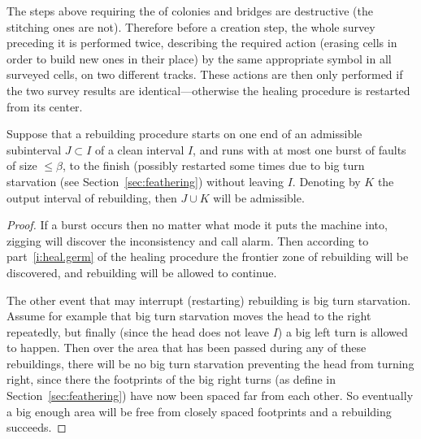 \documentclass[11pt]{memoir}
\theoremstyle{definition} %
\renewcommand{\le}{\leq}
\def\B{B}
\newcommand{\Tu}{T}
\newcommand{\Tus}{T^{*}}
\begin{document}
The steps above requiring the  of colonies and bridges are destructive
(the stitching ones are not).
Therefore before a creation step, the whole survey preceding it is performed twice, 
describing the required action (erasing cells in order to build new ones in their place)
by the same appropriate symbol in all surveyed cells, on two different tracks.
These actions 
are then only performed if the two survey results are identical---otherwise
the healing procedure is restarted from its center.

\begin{lemma}\label{lem:rebuild-health}
  Suppose that a rebuilding procedure starts on one end of an admissible subinterval
  \( J\subset I \) of a clean interval \( I \), and runs with at most one burst of faults
  of size \( \le\beta \), to the finish (possibly restarted
  some times due to big turn starvation (see Section~\ref{sec:feathering}) without leaving \( I \).
  Denoting by \( K \) the output interval of rebuilding, then \( J\cup K \) will be admissible.
\end{lemma}
\begin{proof}
  If a burst occurs then no matter what mode it puts the machine into, 
  zigging will discover the inconsistency and call alarm.
  Then according to part~\eqref{i:heal.germ} of the healing procedure the frontier zone of
  rebuilding will be discovered, and rebuilding will be allowed to continue.

  The other event that may interrupt (restarting) rebuilding is big turn starvation.
  Assume for example that big turn starvation moves the head to the right repeatedly,
  but finally (since the head does not leave \( I \)) a big left turn is allowed to happen.
  Then over the area that has been passed during any of these rebuildings,
  there will be no big turn starvation preventing the head from turning right,
  since there the footprints of the big right turns (as define in Section~\ref{sec:feathering})
  have now been spaced far from each other.
  So eventually a big enough area will be free from closely spaced footprints and a rebuilding succeeds.
\end{proof}


\end{document}
